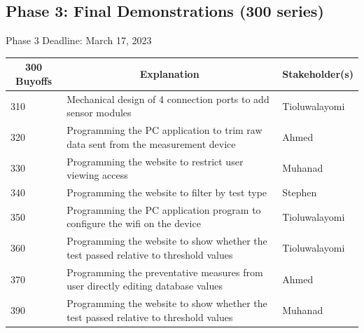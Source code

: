 \documentclass[12pt]{article}
\begin{document}
\noindent
\subsection{Phase 3: Final Demonstrations (300 series)}
Phase 3 Deadline: March 17, 2023\\

\begin{table}[H]
  \centering
  \begin{tabular}{|p{2cm}|p{10cm}|p{2cm}|}
  \hline
  \multicolumn{1}{|c|}{\textbf{300 Buyoffs}} & \multicolumn{1}{c|}{\textbf{Explanation}} & \multicolumn{1}{|c|}{\textbf{Stakeholder(s)}}
  \\ \hline
  310
  & Mechanical design of 4 connection ports to add sensor modules
  & Tioluwalayomi
  \newline                                
  \\ \hline

  320
  & Programming the PC application to trim raw data sent from the measurement device
  & Ahmed
  \newline                                
  \\ \hline

  330                              
  & Programming the website to restrict user viewing access
  & Muhanad
  \newline                                
  \\ \hline

  340
  & Programming the website to filter by test type
  & Stephen
  \newline                                
  \\ \hline

  350                          
  & Programming the PC application program to configure the wifi on the device
  & Tioluwalayomi
  \newline                                
  \\ \hline

  360                                
  & Programming the website to show whether the test passed relative to threshold values
  & Tioluwalayomi 
  \newline                            
  \\ \hline

  370                                
  & Programming the preventative measures from user directly editing database values
  & Ahmed 
  \newline    
  \\ \hline

  390                                
  & Programming the website to show whether the test passed relative to threshold values
  & Muhanad 
  \newline    
  \\ \hline

  \end{tabular}
\end{table}
\end{document}
